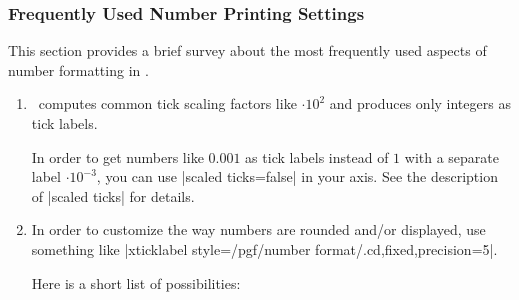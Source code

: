 \subsubsection{Frequently Used Number Printing Settings}
\label{sec:number:faq}
This section provides a brief survey about the most frequently used aspects of number formatting in \PGFPlots. 
\begin{enumerate}
	\item \PGFPlots\ computes common tick scaling factors like $\cdot 10^2$ and produces only integers as tick labels.
	
	In order to get numbers like $0.001$ as tick labels instead of $1$ with a separate label $\cdot 10^{-3}$, you can use |scaled ticks=false| in your axis. See the description of |scaled ticks| for details.

	\item In order to customize the way numbers are rounded and/or displayed,
	use something like |xticklabel style={/pgf/number format/.cd,fixed,precision=5}|. 
	
	Here is a short list of possibilities:
\begin{codeexample}[]
\end{codeexample}
\begin{codeexample}[]
\end{codeexample}

\begin{codeexample}[]
\end{codeexample}

\begin{codeexample}[]
\end{codeexample}

\begin{codeexample}[]
\end{codeexample}

\begin{codeexample}[]
\end{codeexample}

\begin{codeexample}[]
\end{codeexample}

\begin{codeexample}[]
\end{codeexample}


\end{enumerate}

